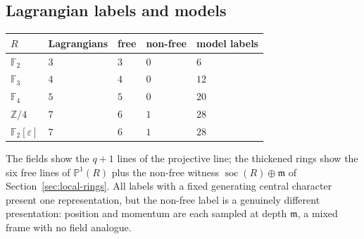\subsection{Lagrangian labels and models}

\begin{center}
\begin{tabular}{lllll}
$R$ & Lagrangians & free & non-free & model labels\\
\hline
$\mathbb F_2$ & $3$ & $3$ & $0$ & $6$\\
$\mathbb F_3$ & $4$ & $4$ & $0$ & $12$\\
$\mathbb F_4$ & $5$ & $5$ & $0$ & $20$\\
$\mathbb Z/4$ & $7$ & $6$ & $1$ & $28$\\
$\mathbb F_2[\varepsilon]$ & $7$ & $6$ & $1$ & $28$\\
\end{tabular}
\end{center}

The fields show the $q+1$ lines of the projective line; the thickened rings
show the six free lines of $\mathbb P^1(R)$ plus the non-free witness
$\operatorname{soc}(R)\oplus\mathfrak m$ of
Section~\ref{sec:local-rings}.  All labels with a fixed generating central
character present one representation, but the non-free label is a genuinely
different presentation: position and momentum are each sampled at depth
$\mathfrak m$, a mixed frame with no field analogue.

